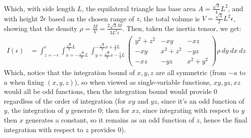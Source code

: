 \documentclass{article}
\begin{document}
Which, with side length $L$, the equilateral triangle has base area $A=\frac{\sqrt{3}}{4}L^2$, and with height $2\epsilon$ based on the chosen range of $z$, the total volume is $V=\frac{\sqrt{3}}{2}L^2\epsilon$, showing that the density $\rho = \frac{M}{V}=\frac{2\sqrt{3}M}{3L^2\epsilon}$. Then, taken the inertia tensor, we get:
\begin{align}
    I(\epsilon) &= \int_{z=-\epsilon}^{\epsilon}\int_{x=-\frac{\sqrt{3}}{6}L}^{\frac{\sqrt{3}}{3}L}\int_{y=\frac{\sqrt{3}}{3}x-\frac{1}{3}L}^{-\frac{\sqrt{3}}{3}x+\frac{1}{3}L} \begin{pmatrix}
        y^2+z^2 & -xy & -xz\\
        -xy & x^2+z^2 & -yz\\
        -xz & -yz & x^2+y^2
    \end{pmatrix}\rho\ dy\ dx\ dz
\end{align}
Which, notice that the integration bound of $x,y,z$ are all symmetric (from $-a$ to $a$ when fixing $(x,y,z)$), so when viewed as single-variable functions, $xy,yz,xz$ would all be odd functions, then the integration bound would provide $0$ regardless of the order of integration (for $xy$ and $yz$, since it's an odd function of $y$, the integration of $y$ generate $0$; then for $xz$, since integrating with respect to $y$ then $x$ generates a constant, so it remains as an odd function of $z$, hence the final integration with respect to $z$ provides $0$). 
\end{document}
